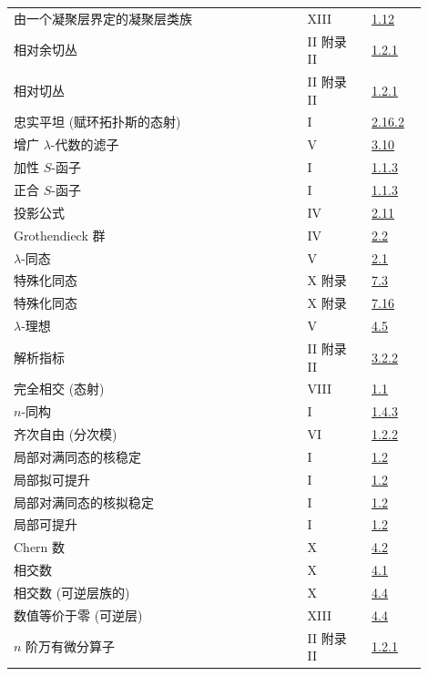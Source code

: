 \begin{longtable}{@{}>{\raggedright\arraybackslash}p{0.64\linewidth}>{\raggedright\arraybackslash}p{0.14\linewidth}>{\raggedright\arraybackslash}p{0.12\linewidth}@{}}
由一个凝聚层界定的凝聚层类族 & XIII & \hyperlink{sga6.e13.para.1-12}{1.12}\\
相对余切丛 & II 附录 II & \hyperlink{sga6.e02.para.1-2-1}{1.2.1}\\
相对切丛 & II 附录 II & \hyperlink{sga6.e02.para.1-2-1}{1.2.1}\\
忠实平坦 (赋环拓扑斯的态射) & I & \hyperlink{sga6.e01.exercise.2-16-2}{2.16.2}\\
增广 \(\lambda\)-代数的滤子 & V & \hyperlink{sga6.e05.para.3-10}{3.10}\\
加性 \(S\)-函子 & I & \hyperlink{sga6.e01.para.1-1-3}{1.1.3}\\
正合 \(S\)-函子 & I & \hyperlink{sga6.e01.para.1-1-3}{1.1.3}\\
投影公式 & IV & \hyperlink{sga6.e04.para.2-11}{2.11}\\
Grothendieck 群 & IV & \hyperlink{sga6.e04.def.2-2}{2.2}\\
\(\lambda\)-同态 & V & \hyperlink{sga6.e05.def.2-1}{2.1}\\
特殊化同态 & X 附录 & \hyperlink{sga6.e10.prop.7-3}{7.3}\\
特殊化同态 & X 附录 & \hyperlink{sga6.e10.sec.7.16}{7.16}\\
\(\lambda\)-理想 & V & \hyperlink{sga6.e05.def.4-5}{4.5}\\
解析指标 & II 附录 II & \hyperlink{sga6.e02.para.3-2-2}{3.2.2}\\
完全相交 (态射) & VIII & \hyperlink{sga6.e08.def.1-1}{1.1}\\
\(n\)-同构 & I & \hyperlink{sga6.e01.def.1-4-3}{1.4.3}\\
齐次自由 (分次模) & VI & \hyperlink{sga6.e06.eq.1-2-2}{1.2.2}\\
局部对满同态的核稳定 & I & \hyperlink{sga6.e01.sec.1.2}{1.2}\\
局部拟可提升 & I & \hyperlink{sga6.e01.sec.1.2}{1.2}\\
局部对满同态的核拟稳定 & I & \hyperlink{sga6.e01.sec.1.2}{1.2}\\
局部可提升 & I & \hyperlink{sga6.e01.sec.1.2}{1.2}\\
Chern 数 & X & \hyperlink{sga6.e10.ex.4-2}{4.2}\\
相交数 & X & \hyperlink{sga6.e10.sec.4.1}{4.1}\\
相交数 (可逆层族的) & X & \hyperlink{sga6.e10.sec.4.4}{4.4}\\
数值等价于零 (可逆层) & XIII & \hyperlink{sga6.e13.para.4-4}{4.4}\\
\(n\) 阶万有微分算子 & II 附录 II & \hyperlink{sga6.e02.para.1-2-1}{1.2.1}\\

\end{longtable}
